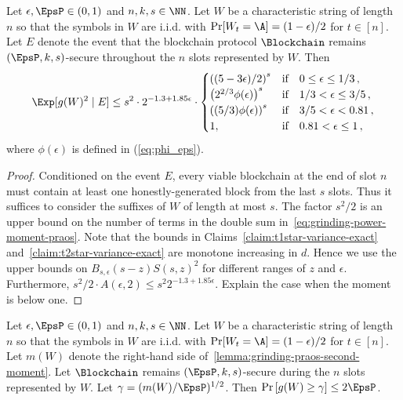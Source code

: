\begin{lemma}\label{lemma:grinding-praos-second-moment}
  Let $\epsilon, \EpsP \in (0, 1)$ and $n, k, s \in \NN$. 
  Let $W$ be a characteristic string of length $n$ so that 
  the symbols in $W$ are i.i.d. 
  with $\Pr[W_t = \A] = (1 - \epsilon)/2$ for $t \in [n]$. 
  Let $E$ denote the event that 
  the blockchain protocol $\Blockchain$ 
  remains $(\EpsP, k, s)$-secure throughout 
  the $n$ slots represented by $W$. 
  Then
  \begin{equation}\label{eq:grindign-praos-second-moment}
    \Exp[ g(W)^2 \mid E] 
    \leq s^2 \cdot 2^{- 1.3 + 1.85 \epsilon} \cdot \begin{cases}
      \left( (5-3 \epsilon)/2 \right)^s & \text{if}\quad 0 \leq \epsilon \leq 1/3\,, \\
      \left( 2^{2/3} \phi(\epsilon) \right)^s & \text{if}\quad 1/3 < \epsilon \leq 3/5\,, \\
      \left( (5/3) \phi(\epsilon) \right)^s & \text{if}\quad 3/5 < \epsilon < 0.81\,, \\
      1,  & \text{if}\quad 0.81 < \epsilon \leq 1\,,
    \end{cases}    
  \end{equation}
  where $\phi(\epsilon)$ is defined in (\ref{eq:phi_eps}).
\end{lemma}
\begin{proof}
  Conditioned on the event $E$, 
  every viable blockchain at the end of slot $n$ 
  must contain at least one honestly-generated block from the last $s$ slots. 
  Thus it suffices to consider the suffixes of $W$ of length at most $s$. 
  The factor $s^2/2$ is an upper bound on 
  the number of terms in the double sum in~\eqref{eq:grinding-power-moment-praos}. 
  Note that the bounds in 
  Claims~\ref{claim:t1star-variance-exact} 
  and~\ref{claim:t2star-variance-exact} are monotone increasing in $d$. 
  Hence we use the upper bounds on $B_{s, \epsilon}(s-z) S(s,z)^2$ for 
  different ranges of $z$ and $\epsilon$. 
  Furthermore, $s^2/2 \cdot A(\epsilon,2) \leq s^2 2^{-1.3 + 1.85 \epsilon}$.
  {\color{blue}Explain the case when the moment is below one.}
\end{proof}


\begin{theorem}\label{thm:praos-tail-gamma}
  Let $\epsilon, \EpsP \in (0, 1)$ and $n, k, s \in \NN$. 
  Let $W$ be a characteristic string of length $n$ so that 
  the symbols in $W$ are i.i.d. 
  with $\Pr[W_t = \A] = (1 - \epsilon)/2$ for $t \in [n]$. 
  Let $m(W)$ denote the right-hand side of~\eqref{lemma:grinding-praos-second-moment}. 
  Let $\Blockchain$ remains $(\EpsP, k, s)$-secure during 
  the $n$ slots represented by $W$. 
  Let $\gamma = (m(W)/\EpsP)^{1/2}$.
  Then 
  $
      \Pr\left[g(W) \geq \gamma\right] \leq 2 \EpsP
  $.
\end{theorem}

